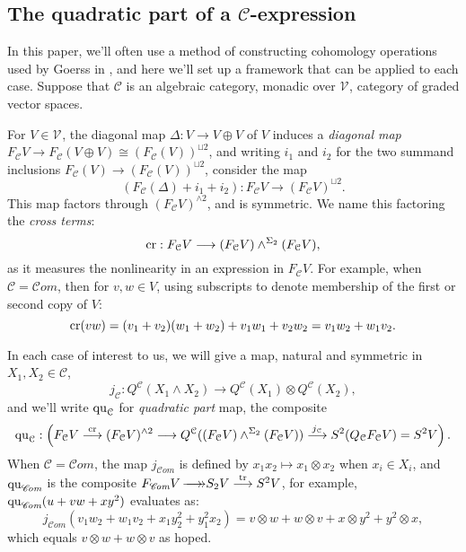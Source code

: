 \documentclass[11pt]{amsart}
\theoremstyle{plain}
\theoremstyle{definition}
\DeclareMathOperator{\trace}{tr}
\renewcommand{\to}{\longrightarrow}
\newcommand{\scrC}{\mathscr{C}}
\newcommand{\calC}{\mathcal{C}}
\newcommand{\calV}{\mathcal{V}}
\newcommand{\calc}{\mathcal{C}}
\theoremstyle{plain}
\newcommand{\vect}[2]{\calV^{#1}_{#2}}
\newcommand{\quadratic}{\textup{qu}}
\newcommand{\crossterms}{\textup{cr}}
\newcommand{\epi}{{\,\makebox[0cm][l]{\ensuremath\to}\to}}
\newcommand{\algs}{{\scrC\!\textit{om}}}
\begin{document}
\begin{CPiAlgs and CHalgs}
\subsection{The quadratic part of a $\calC$-expression}\label{quadratic part section}
In this paper, we'll often use a method of constructing cohomology operations used by Goerss in \cite[\S5]{MR1089001}, and here we'll set up a framework that can be applied to each case. Suppose that $\calC$ is an algebraic category, monadic over $\vect{}{}$, category of graded vector spaces. 



For $V\in\vect{}{}$, the diagonal map $\Delta:V\to V\oplus V$ of $V$ induces a \emph{diagonal map} $F_\calC V\to F_\calC (V\oplus V)\cong (F_\calC (V))^{\sqcup 2}$, and writing $i_1$ and $i_2$ for the two summand inclusions $F_\calC (V)\to (F_\calC (V))^{\sqcup 2}$, consider the map
\[(F_\calC(\Delta)+i_1+i_2):F_\calC V\to (F_\calC V)^{\sqcup2}.\]
This map  factors through $(F_\calC V)^{\wedge 2}$, and is symmetric. We name this factoring the \emph{cross terms}:
\[\crossterms:F_\calC V\to (F_\calC V)\wedge^{\Sigma_2} (F_\calC V),\]
as it measures the nonlinearity in an expression in $F_\calC V$. For example, when $\calC=\algs$, then for $v,w\in V$, using subscripts to denote membership of the first or second copy of $V$:
\[\crossterms(vw)=(v_1+v_2)(w_1+w_2)+v_1w_1+v_2w_2=v_1w_2+w_1v_2.\]

In each case of interest to us, we will give a map, natural and symmetric in $X_1,X_2\in\calC$,
\[j_\calC:Q^\calC(X_1\wedge X_2)\to Q^\calC(X_1)\otimes Q^\calC(X_2),\]
and we'll write $\quadratic_\calC$ for \emph{quadratic part} map, the composite
\[\quadratic_\calC:\left(F_\calC V\overset{\crossterms}{\to}(F_\calC V)^{\wedge 2}\to Q^\calC((F_\calC V)\wedge^{\Sigma_2} (F_\calC V))\overset{j_\calC}{\to}S^2(Q_{\calc}F_{\calC}V)=S^2V\right).\]
When $\calC=\algs$, the map $j_{\algs}$ is defined by $x_1x_2\mapsto x_1\otimes x_2$ when $x_i\in X_i$, and $\quadratic_{\algs}$ is the composite $F_{\algs} V\epi S_2V\overset{\trace}{\to}S^2V$, for example,  $\quadratic_{\algs}(u+vw+xy^2)$ evaluates as:
\[j_{\algs}(v_1w_2+w_1v_2+x_1y_2^2+y_1^2x_2)=v\otimes w+w\otimes v+x\otimes y^2+y^2\otimes x,\]
which equals $v\otimes w+w\otimes v$ %
as hoped.


\end{CPiAlgs and CHalgs}
\end{document}
